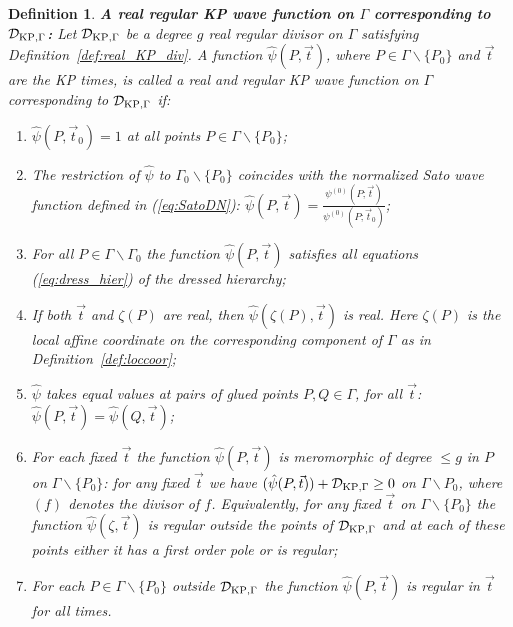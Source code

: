 \documentclass[11pt]{amsart}
\theoremstyle{plain}
\numberwithin{equation}{section}
\newtheorem{definition}{Definition}[subsection]
\def \DKP {{\mathcal D}_{\textup{\scriptsize KP},\Gamma}}
\begin{document}
\begin{definition}\label{def:KPwave}{\bf A real regular KP wave function on $\Gamma$ corresponding to $\DKP$:}  
Let $\DKP$ be a degree $g$ real regular divisor on $\Gamma$ satisfying Definition~\ref{def:real_KP_div}.
A function ${\hat \psi} (P, \vec t)$, where $P\in\Gamma\backslash \{ P_0\}$ and $\vec t$ are the KP times, is called a real and regular KP wave function on $\Gamma$ corresponding to $\DKP$ if:
\begin{enumerate}
\item $\hat \psi (P, \vec t_0)=1$ at all points $P\in \Gamma\backslash \{P_0\} $;
\item The restriction of $\hat \psi$ to $\Gamma_0\backslash \{P_0\}$ coincides with the normalized Sato wave function defined in (\ref{eq:SatoDN}): ${\hat \psi } (P, \vec t)  = \frac{\psi^{(0)} (P; \vec t)}{\psi^{(0)} (P; \vec t_0)}$; 
\item For all $P\in\Gamma\backslash\Gamma_0$ the function ${\hat \psi} (P, \vec t)$ satisfies all equations (\ref{eq:dress_hier}) of the dressed hierarchy;
\item If both $\vec t$ and $\zeta(P)$ are real, then ${\hat \psi} (\zeta(P), \vec t)$ is real. Here $\zeta(P)$ is the local affine coordinate on the corresponding component of $\Gamma$ as in Definition~\ref{def:loccoor};
\item\label{it:comp} $\hat \psi$ takes equal values at pairs of glued points $P,Q\in \Gamma$, for all $\vec t$:  $\hat \psi(P, \vec t) = \hat \psi(Q, \vec t)$;
\item For each fixed $\vec t$ the function $\hat \psi(P, \vec t)$ is meromorphic of degree $\le g$ in $P$ on $\Gamma\backslash \{ P_0\}$: for any fixed $\vec t$ we have $({\hat \psi} (P, \vec t))+\DKP\ge 0$ on $\Gamma\backslash P_0$, where $(f)$ denotes the divisor 
of $f$. Equivalently, for any fixed $\vec t$ on $\Gamma\backslash \{ P_0\}$ the function $\hat \psi(\zeta, \vec t)$ is regular outside the points of 
$\DKP$ and at each of these points either it has a first order pole or is regular;
\item For each $P\in\Gamma\backslash \{ P_0\}$ outside  $\DKP$  the function $\hat \psi(P, \vec t)$ is regular in $\vec t$ for all times.
\end{enumerate}
\end{definition}
\end{document}
